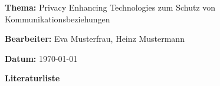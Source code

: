 \documentclass[
    fontsize=12pt,
    headings=small,
    parskip=half,           %
    bibliography=totoc,
    numbers=noenddot,       %
    open=any,               %
    ]{scrreprt}
\begin{document}
\newpage
\thispagestyle{empty}
\label{sec:literaturliste}
\par\textbf{\textsf{Thema:}} Privacy Enhancing Technologies zum Schutz von Kommunikationsbeziehungen
\par\textbf{\textsf{Bearbeiter:}} Eva Musterfrau, Heinz Mustermann
\par\textbf{\textsf{Datum:}} \today
\bigskip
\par\textbf{\Large\textsf{Literaturliste}}

\listoftodos
\end{document}
